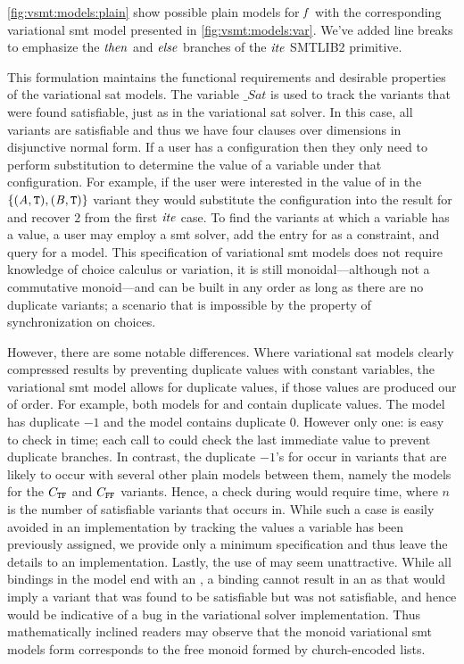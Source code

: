 \autoref{fig:vsmt:models:plain} show possible plain models for $\mathit{f}$ with the
corresponding variational \ac{smt} model presented in
\autoref{fig:vsmt:models:var}. We've added line breaks to emphasize the
$\mathit{then}$ and $\mathit{else}$ branches of the $\mathit{ite}$ SMTLIB2 primitive. 

This formulation maintains the functional requirements and desirable properties
of the variational \ac{sat} models. The variable $\_Sat$ is used to track the
variants that were found satisfiable, just as in the variational \ac{sat}
solver. In this case, all variants are satisfiable and thus we have four clauses
over dimensions in disjunctive normal form. If a user has a configuration then
they only need to perform substitution to determine the value of a variable
under that configuration. For example, if the user were interested in the value
of \iV{} in the $\{(\mathit{A}{}, \texttt{T}{}), (\mathit{B}{}, \texttt{T}{})\}$ variant they would
substitute the configuration into the result for \iV{} and recover $2$ from the
first $\mathit{ite}$ case. To find the variants at which a variable has a value, a
user may employ a \ac{smt} solver, add the entry for \iV{} as a constraint, and
query for a model.
%
This specification of variational \ac{smt} models does not require knowledge of
choice calculus or variation, it is still monoidal---although not a commutative
monoid---and can be built in any order as long as there are no duplicate
variants; a scenario that is impossible by the property of synchronization on
choices.


However, there are some notable differences. Where variational \ac{sat} models
clearly compressed results by preventing duplicate values with constant
variables, the variational \ac{smt} model allows for duplicate values, if those
values are produced our of order. For example, both models for \iV{} and \cV{}
contain duplicate values. The \iV{} model has duplicate $-1$ and the \cV{} model
contains duplicate $0$. However only one: \cV{} is easy to check in 
time; each call to  could check the last immediate value to prevent
duplicate branches. In contrast, the duplicate $-1$'s for \iV{} occur in
variants that are likely to occur with several other plain models between them,
namely the models for the $C_{\texttt{T}\texttt{F}}$ and $C_{\texttt{F}\texttt{F}}$ variants. Hence, a
check during  would require  time, where $n$ is the number
of satisfiable variants that \iV{} occurs in. While such a case is easily
avoided in an implementation by tracking the values a variable has been
previously assigned, we provide only a minimum specification and thus leave the
details to an implementation.
%
Lastly, the use of \undefined{} may seem unattractive. While all bindings in the
model end with an \undefined{}, a binding cannot result in an \undefined{} as
that would imply a variant that was found to be satisfiable but was not
satisfiable, and hence would be indicative of a bug in the variational solver
implementation. Thus mathematically inclined readers may observe that the monoid
variational \ac{smt} models form corresponds to the free monoid formed by
church-encoded lists.

